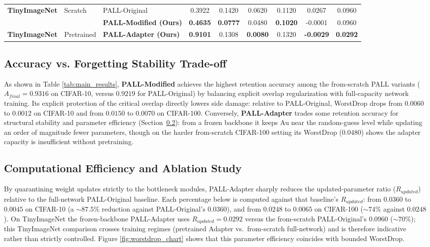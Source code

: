 \documentclass[conference]{IEEEtran}
\theoremstyle{plain}
\theoremstyle{definition}
\theoremstyle{remark}
\begin{document}
\begin{table}[t]
{\begin{tabular}{@{}lllcccccc@{}}
\multirow{2}{*}{\textbf{TinyImageNet}} & \multirow{2}{*}{Scratch}
& PALL-Original & 0.3922 & 0.1420 & 0.0620 & 0.1120 & 0.0267 & 0.0960 \\
& & \textbf{PALL-Modified (Ours)} & \textbf{0.4635} & \textbf{0.0777} & 0.0480 & \textbf{0.1020} & -0.0001 & 0.0960 \\ \midrule
\textbf{TinyImageNet} & Pretrained & \textbf{PALL-Adapter (Ours)} & \textbf{0.9101} & 0.1308 & \textbf{0.0080} & 0.1320 & \textbf{-0.0029} & \textbf{0.0292} \\ \bottomrule
\end{tabular}%
}
\end{table}

\subsection{Accuracy vs. Forgetting Stability Trade-off}
As shown in Table \ref{tab:main_results}, \textbf{PALL-Modified} achieves the highest retention accuracy among the from-scratch PALL variants (\(A_{final} = 0.9316\) on CIFAR-10, versus \(0.9219\) for PALL-Original) by balancing explicit overlap regularization with full-capacity network training. Its explicit protection of the critical overlap directly lowers side damage: relative to PALL-Original, WorstDrop drops from \(0.0060\) to \(0.0012\) on CIFAR-10 and from \(0.0150\) to \(0.0070\) on CIFAR-100. Conversely, \textbf{PALL-Adapter} trades some retention accuracy for structural stability and parameter efficiency (Section~\ref{subsec:efficiency}): from a frozen backbone it keeps Au near the random-guess level while updating an order of magnitude fewer parameters, though on the harder from-scratch CIFAR-100 setting its WorstDrop (\(0.0480\)) shows the adapter capacity is insufficient without pretraining.

\subsection{Computational Efficiency and Ablation Study}
\label{subsec:efficiency}
By quarantining weight updates strictly to the bottleneck modules, PALL-Adapter sharply reduces the updated-parameter ratio (\(R_{updated}\)) relative to the full-network PALL-Original baseline. Each percentage below is computed against that baseline's \(R_{updated}\): from \(0.0360\) to \(0.0045\) on CIFAR-10 (a \(\sim\!87.5\%\) reduction against PALL-Original's \(0.0360\)), and from \(0.0248\) to \(0.0065\) on CIFAR-100 (\(\sim\!74\%\) against \(0.0248\)). On TinyImageNet the frozen-backbone PALL-Adapter uses \(R_{updated}=0.0292\) versus the from-scratch PALL-Original's \(0.0960\) (\(\sim\!70\%\)); this TinyImageNet comparison crosses training regimes (pretrained Adapter vs.\ from-scratch full-network) and is therefore indicative rather than strictly controlled. Figure \ref{fig:worstdrop_chart} shows that this parameter efficiency coincides with bounded WorstDrop.
\end{document}

